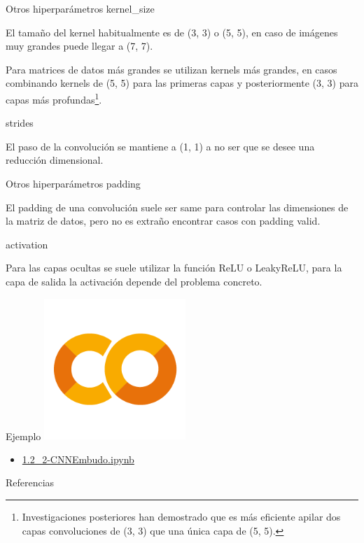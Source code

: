 \begin{frame}{Otros hiperparámetros}
\alert{\Large kernel\_size}

El tamaño del kernel \alert{habitualmente} es de \alert{(3, 3)} o \alert{(5, 5)}, en caso de imágenes muy grandes puede llegar a \alert{(7, 7)}.

Para matrices de datos \alert{más grandes} se utilizan \alert{kernels más grandes}, en casos combinando kernels de \alert{(5, 5)} para las \alert{primeras capas} y posteriormente \alert{(3, 3)} para capas más \alert{profundas}\footnote{Investigaciones posteriores \cite{simonyan2014very} han demostrado que es más eficiente apilar dos capas convoluciones de (3, 3) que una única capa de (5, 5).}.

\vfill
\alert{\Large strides}

El paso de la convolución se mantiene a \alert{(1, 1)} a no ser que se desee una \alert{reducción dimensional}.
\end{frame}

\begin{frame}{Otros hiperparámetros}
\alert{\Large padding}

El padding de una convolución suele ser \alert{same} para controlar las dimensiones de la matriz de datos, pero no es extraño encontrar casos con padding \alert{valid}.

\vfill
\alert{\Large activation}

Para las \alert{capas ocultas} se suele utilizar la función \alert{ReLU} o \alert{LeakyReLU}, para la capa de \alert{salida} la activación depende del \alert{problema concreto}.
\end{frame}

\begin{frame}{Ejemplo}
    \centering
    \includegraphics[width=0.4\textwidth]{Slides/figures/GoogleColab.png}
\begin{itemize}
    \centering
    \item {\Large \href{https://colab.research.google.com/drive/17QwnRs7P0bv6kYsbQPYIrIDjk-uL_9rd?usp=sharing}{1.2\_2-CNNEmbudo.ipynb}}
\end{itemize}
\end{frame}


\begin{frame}[allowframebreaks]{Referencias}
    
    
\end{frame}

